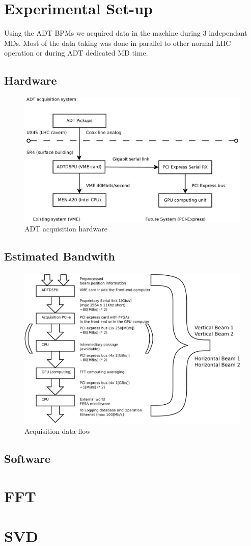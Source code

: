 \section{Experimental Set-up}

Using the \gls{ADT} \glspl{BPM} we acquired data in the machine during 3 
independant \glspl{MD}. Most of the data taking was done in parallel to 
other normal LHC operation or during \gls{ADT} dedicated \gls{MD} time.

   \subsection{Hardware}

\begin{figure}
\caption{ADT acquisition hardware}
\centering
\includegraphics[scale=0.3]{acquisition.pdf}
\end{figure}

   \subsection{Estimated Bandwith}

\begin{figure}
\caption{Acquisition data flow}
\centering
\includegraphics[scale=0.3]{dataflow.pdf}
\end{figure}

   \subsection{Software}

\section{FFT}

\section{SVD}
